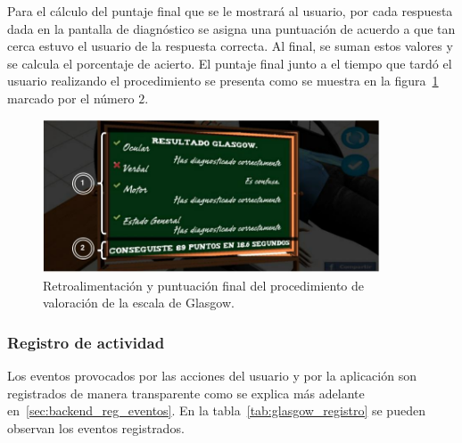 Para el cálculo del puntaje final que se le mostrará al usuario, por cada
respuesta dada en la pantalla de diagnóstico se asigna una puntuación de acuerdo
a que tan cerca estuvo el usuario de la respuesta correcta. Al final, se suman
estos valores y se calcula el porcentaje de acierto. El puntaje final junto a el
tiempo que tardó el usuario realizando el procedimiento se presenta como se
muestra en la figura~\ref{fig:glasgow_resultado} marcado por el número $2$.

\begin{figure}[H]
\centering
\includegraphics[width=10cm]{solucion/images/glasgow_resultado.jpg}
\caption{Retroalimentación y puntuación final del procedimiento de valoración de 
la escala de Glasgow.}
\label{fig:glasgow_resultado}
\end{figure}


\subsubsection{Registro de actividad}

Los eventos provocados por las acciones del usuario y por la aplicación son registrados de 
manera transparente como se explica más adelante en~\ref{sec:backend_reg_eventos}. En la 
tabla~\ref{tab:glasgow_registro} se pueden observan los eventos registrados.

%



